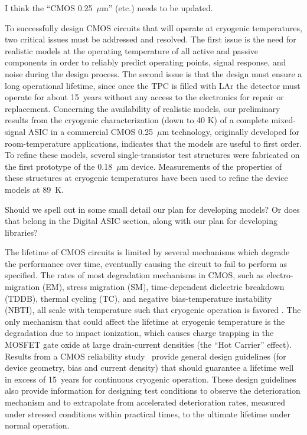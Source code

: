 \begin{editornote}
  I think the ``CMOS 0.25~$\mu$m'' (etc.) needs to be updated.
\end{editornote}
To successfully design CMOS circuits that will operate at cryogenic 
temperatures, two critical issues must be addressed and resolved. 
The first issue is the need for realistic models at the operating temperature 
of all active and passive components in order to reliably predict operating points,
signal response, and noise during the design process.
The second issue is that the design must ensure a long operational lifetime, since once the TPC is filled 
with LAr the detector must operate for about 15~years without any access to the 
electronics for repair or replacement.
Concerning the availability of realistic models, 
our preliminary results from the cryogenic characterization (down to 40 K) of a complete 
mixed-signal ASIC \cite{CMOS-Compton} in a commercial CMOS 0.25~$\mu$m technology, 
originally developed for room-temperature applications, indicates that the models 
are useful to first order.
To refine these models, several 
single-transistor test structures were fabricated on the first prototype of the 0.18~$\mu$m device. 
Measurements of the properties of these structures at cryogenic temperatures 
have been used to refine the device models at 89~K. 
\begin{editornote}
  Should we spell out in some small detail our plan for developing models?
  Or does that belong in the Digital ASIC section, along with our plan for developing libraries?
\end{editornote}

The lifetime of CMOS circuits is limited by several mechanisms which degrade 
the performance over time, eventually causing the circuit to fail to perform as specified. 
The rates of most degradation mechanisms in CMOS, such as electro-migration (EM), 
stress migration (SM), time-dependent dielectric breakdown (TDDB), thermal cycling (TC), 
and negative bias-temperature instability (NBTI), all scale with temperature such that 
cryogenic operation is favored \cite{CMOS-lifetime}\cite{PMOS-model}. The only mechanism 
that could affect the lifetime at cryogenic temperature is the degradation due to 
impact ionization, which causes charge trapping in the MOSFET gate oxide at 
large drain-current densities (the ``Hot Carrier'' effect). Results from a CMOS reliability study~\cite{CMOS-reliability} 
provide general design guidelines (for device geometry, bias and current density) 
that should guarantee a lifetime well in excess of 15~years for continuous cryogenic operation. 
These design guidelines also provide information for designing test conditions to observe the 
deterioration mechanism and to extrapolate from accelerated deterioration rates, 
measured under stressed conditions within practical times, to the ultimate lifetime under normal operation.

